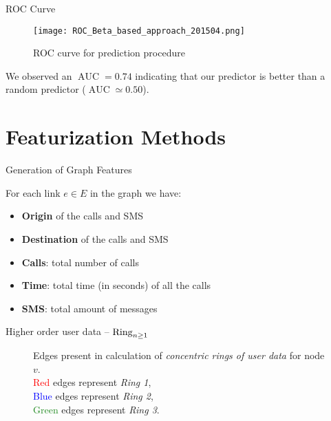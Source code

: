 \documentclass[usenames,dvipsnames]{beamer}
\newcommand{\AUC}{\operatorname{AUC}}
\begin{document}
\begin{frame}{ROC Curve}

\begin{figure}
\begin{center}
\texttt{[image: ROC\_Beta\_based\_approach\_201504.png]}
\caption{ROC curve for prediction procedure}
\label{ROC_multiclass}
\end{center}
\end{figure}

We observed an $\AUC = 0.74$ indicating that our predictor is better than a random predictor ($\AUC \simeq 0.50$).

\end{frame}





\section{Featurization Methods}


\begin{frame}{Generation of Graph Features}

For each link $e \in E$ in the graph we have:

\begin{itemize}
	\item \textbf{Origin} of the calls and SMS
	\item \textbf{Destination} of the calls and SMS
	\item \textbf{Calls}: total number of calls
	\item \textbf{Time}: total time (in seconds) of all the calls
	\item \textbf{SMS}: total amount of messages
\end{itemize}

\end{frame}


\begin{frame}{Higher order user data -- $\operatorname{Ring}_{n \geq 1}$ }

\begin{figure}
\centering
\framebox[\columnwidth]{%
	
}
\caption{Edges present in calculation of \emph{concentric rings of user data} for node $v$. \\
\textcolor{red}{Red} edges represent \emph{Ring 1},\\
 \textcolor{blue}{Blue} edges represent \emph{Ring 2}, \\
 \textcolor{ForestGreen}{Green} edges represent \emph{Ring 3}.}
\label{fig:higherorderuserdata}
\end{figure}


\end{frame}
\end{document}

